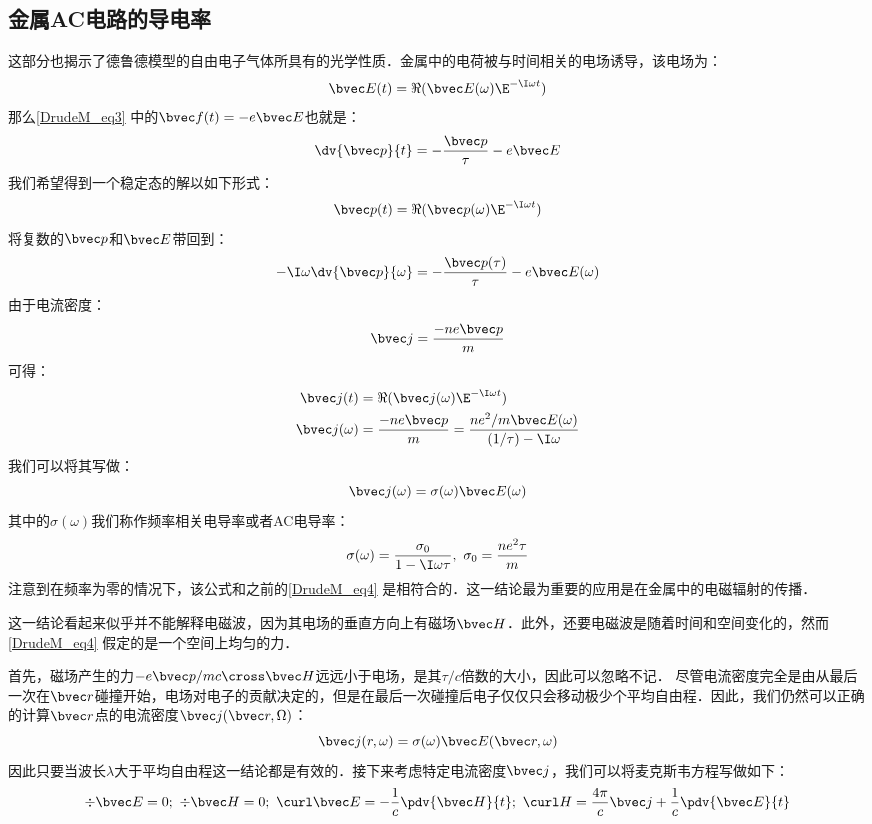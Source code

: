 \subsection{金属AC电路的导电率}
这部分也揭示了德鲁德模型的自由电子气体所具有的光学性质．金属中的电荷被与时间相关的电场诱导，该电场为：
\begin{equation}
\bvec E(t)=\Re(\bvec E(\omega)\E^{-\I\omega t})
\end{equation}
那么\autoref{DrudeM_eq3} 中的$\bvec f(t)=-e\bvec E$也就是：
\begin{equation}
\dv{\bvec p}{t}=-\frac{\bvec p}{\tau}-e\bvec E
\end{equation}
我们希望得到一个稳定态的解以如下形式：
\begin{equation}
\bvec p(t)=\Re(\bvec p(\omega)\E^{-\I\omega t})
\end{equation}
将复数的$\bvec p$和$\bvec E$带回到：
\begin{equation}
-\I\omega\dv{\bvec p}{\omega}=-\frac{\bvec p(\tau)}{\tau}-e\bvec E(\omega)
\end{equation}
由于电流密度：
\begin{equation}
\bvec j = \frac{-ne\bvec p}{m}
\end{equation}
可得：
\begin{align}
\bvec j(t)&=\Re(\bvec j(\omega)\E^{-\I\omega t})\\
\bvec j(\omega)&=\frac{-ne\bvec p}{m}=\frac{ne^2/m\bvec E(\omega)}{(1/\tau)-\I\omega}
\end{align}
我们可以将其写做：
\begin{equation}
\bvec j(\omega)=\sigma(\omega)\bvec E(\omega)
\end{equation}
其中的$\sigma(\omega)$我们称作频率相关电导率或者AC电导率：
\begin{equation}
\sigma(\omega)=\frac{\sigma_0}{1-\I\omega\tau},\ \sigma_0=\frac{ne^2\tau}{m}
\end{equation}
注意到在频率为零的情况下，该公式和之前的\autoref{DrudeM_eq4} 是相符合的．这一结论最为重要的应用是在金属中的电磁辐射的传播．

这一结论看起来似乎并不能解释电磁波，因为其电场的垂直方向上有磁场$\bvec H$．此外，还要电磁波是随着时间和空间变化的，然而\autoref{DrudeM_eq4} 假定的是一个空间上均匀的力．

首先，磁场产生的力$-e\bvec p/mc\cross \bvec H$远远小于电场，是其$\tau/c$倍数的大小，因此可以忽略不记．
尽管电流密度完全是由从最后一次在$\bvec r$碰撞开始，电场对电子的贡献决定的，但是在最后一次碰撞后电子仅仅只会移动极少个平均自由程．因此，我们仍然可以正确的计算$\bvec r$点的电流密度$\bvec j(\bvec r,\Omega)$：
\begin{equation}
\bvec j(r,\omega)=\sigma(\omega)\bvec E(\bvec r,\omega)
\end{equation}
因此只要当波长$\lambda$大于平均自由程这一结论都是有效的．接下来考虑特定电流密度$\bvec j$，我们可以将麦克斯韦方程写做如下：
\begin{equation}
\div \bvec E =0;\ \div \bvec H = 0;\ \curl \bvec E =-\frac{1}{c}\pdv{ \bvec H}{t};\ \curl H = \frac{4\pi}{c}\bvec j+\frac{1}{c}\pdv{ \bvec E}{t}
\end{equation}

